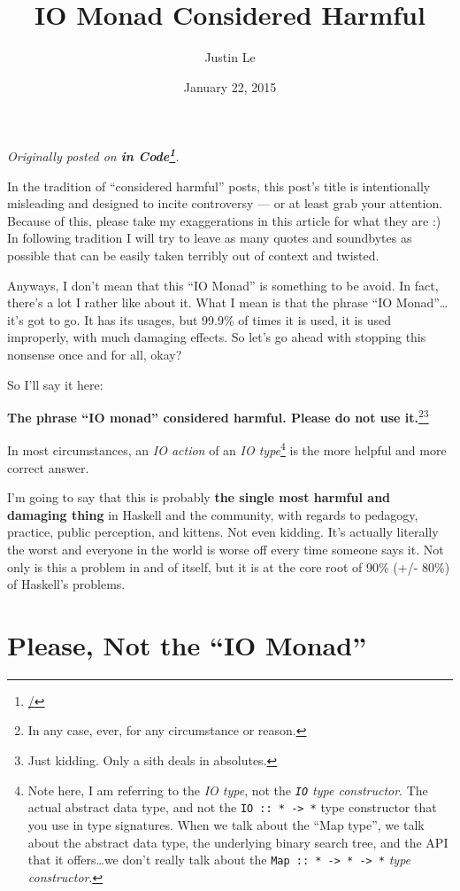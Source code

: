 \documentclass[]{article}
\title{IO Monad Considered Harmful}
\author{Justin Le}
\date{January 22, 2015}
\renewcommand{\href}[2]{#2\footnote{\url{#1}}}
\begin{document}
\maketitle

\emph{Originally posted on \textbf{\href{/}{in Code}}.}

In the tradition of ``considered harmful'' posts, this post's title is
intentionally misleading and designed to incite controversy --- or at
least grab your attention. Because of this, please take my exaggerations
in this article for what they are :) In following tradition I will try
to leave as many quotes and soundbytes as possible that can be easily
taken terribly out of context and twisted.

Anyways, I don't mean that this ``IO Monad'' is something to be avoid.
In fact, there's a lot I rather like about it. What I mean is that the
phrase ``IO Monad''\ldots{}it's got to go. It has its usages, but 99.9\%
of times it is used, it is used improperly, with much damaging effects.
So let's go ahead with stopping this nonsense once and for all, okay?

So I'll say it here:

\textbf{The phrase ``IO monad'' considered harmful. Please do not use
it.}\footnote{In any case, ever, for any circumstance or reason.}\footnote{Just
  kidding. Only a sith deals in absolutes.}

In most circumstances, an \emph{IO action} of an \emph{IO
type}\footnote{Note here, I am referring to the \emph{IO type}, not the
  \emph{\texttt{IO} type constructor}. The actual abstract data type,
  and not the \texttt{IO\ ::\ *\ -\textgreater{}\ *} type constructor
  that you use in type signatures. When we talk about the ``Map type'',
  we talk about the abstract data type, the underlying binary search
  tree, and the API that it offers\ldots{}we don't really talk about the
  \texttt{Map\ ::\ *\ -\textgreater{}\ *\ -\textgreater{}\ *} \emph{type
  constructor}.} is the more helpful and more correct answer.

I'm going to say that this is probably \textbf{the single most harmful
and damaging thing} in Haskell and the community, with regards to
pedagogy, practice, public perception, and kittens. Not even kidding.
It's actually literally the worst and everyone in the world is worse off
every time someone says it. Not only is this a problem in and of itself,
but it is at the core root of 90\% (+/- 80\%) of Haskell's problems.

\section{\texorpdfstring{Please, Not the ``IO
Monad''}{Please, Not the IO Monad}}\label{please-not-the-io-monad}
\end{document}
